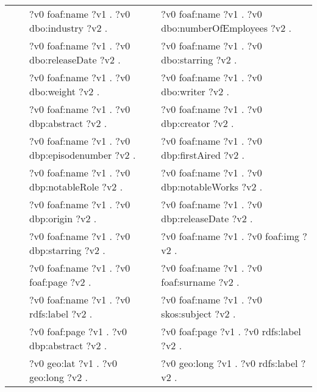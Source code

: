 \begin{table}
{\begin{tabular}{!{\color{white}\vrule}l!{\color{white}\vrule}c@{\hs}!{\color{white}\vrule}p{11.5cm}!{\color{white}\vrule}p{11.5cm}!{\color{white}\vrule}}
			 &  \phantom{a} &     ?v0 foaf:name ?v1 .  ?v0 dbo:industry ?v2 . &  ?v0 foaf:name ?v1 .  ?v0 dbo:numberOfEmployees ?v2 . \\
			 &  \phantom{a} &     ?v0 foaf:name ?v1 .  ?v0 dbo:releaseDate ?v2 . &  ?v0 foaf:name ?v1 .  ?v0 dbo:starring ?v2 . \\
			 &  \phantom{a} &     ?v0 foaf:name ?v1 .  ?v0 dbo:weight ?v2 . &  ?v0 foaf:name ?v1 .  ?v0 dbo:writer ?v2 . \\
			 &  \phantom{a} &     ?v0 foaf:name ?v1 .  ?v0 dbp:abstract ?v2 . &  ?v0 foaf:name ?v1 .  ?v0 dbp:creator ?v2 . \\
			 &  \phantom{a} &     ?v0 foaf:name ?v1 .  ?v0 dbp:episodenumber ?v2 . &  ?v0 foaf:name ?v1 .  ?v0 dbp:firstAired ?v2 . \\
			 &  \phantom{a} &     ?v0 foaf:name ?v1 .  ?v0 dbp:notableRole ?v2 . &  ?v0 foaf:name ?v1 .  ?v0 dbp:notableWorks ?v2 . \\
			 &  \phantom{a} &     ?v0 foaf:name ?v1 .  ?v0 dbp:origin ?v2 . &  ?v0 foaf:name ?v1 .  ?v0 dbp:releaseDate ?v2 . \\
			 &  \phantom{a} &     ?v0 foaf:name ?v1 .  ?v0 dbp:starring ?v2 . &  ?v0 foaf:name ?v1 .  ?v0 foaf:img ?v2 . \\
			 &  \phantom{a} &     ?v0 foaf:name ?v1 .  ?v0 foaf:page ?v2 . &  ?v0 foaf:name ?v1 .  ?v0 foaf:surname ?v2 . \\
			 &  \phantom{a} &     ?v0 foaf:name ?v1 .  ?v0 rdfs:label ?v2 . &  ?v0 foaf:name ?v1 .  ?v0 skos:subject ?v2 . \\
			 &  \phantom{a} &     ?v0 foaf:page ?v1 .  ?v0 dbp:abstract ?v2 . &  ?v0 foaf:page ?v1 .  ?v0 rdfs:label ?v2 . \\
			 &  \phantom{a} &     ?v0 geo:lat ?v1 .  ?v0 geo:long ?v2 . &  ?v0 geo:long ?v1 .  ?v0 rdfs:label ?v2 . \\

\end{tabular}}
\end{table}
